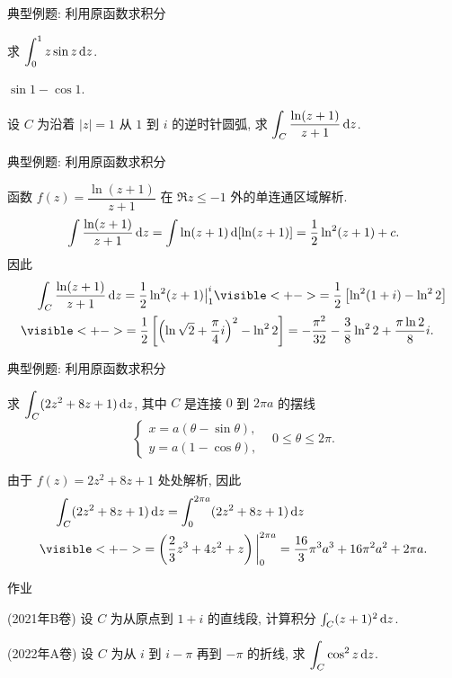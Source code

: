 \begin{frame}{典型例题: 利用原函数求积分}
\begin{exercise}
求 $\displaystyle\int_0^1 z\sin z\,\mathrm{d} z$.
\end{exercise}

\begin{answer}
$\sin 1-\cos 1$.
\end{answer}
\begin{example}
设 $C$ 为沿着 $|z|=1$ 从 $1$ 到 $i$ 的逆时针圆弧, 求 $\displaystyle\int_C\frac{\ln(z+1)}{z+1}\,\mathrm{d} z$.
\end{example}
\end{frame}


\begin{frame}{典型例题: 利用原函数求积分}
\begin{solution}
函数 $f(z)=\dfrac{\ln(z+1)}{z+1}$ 在 $\Re z\le -1$ 外的单连通区域解析.
\onslide<+->
\[\int\frac{\ln(z+1)}{z+1}\,\mathrm{d} z
=\int\ln(z+1)\,\mathrm{d}[\ln(z+1)]=\frac12\ln^2(z+1)+c.\]
\onslide<+->
因此
\begin{align*}
&\peq\int_C\frac{\ln(z+1)}{z+1}\diff z=\frac12\ln^2(z+1)\big|_1^i
\visible<+->{=\frac12\left[\ln^2(1+i)-\ln^22\right]}\\
&\visible<+->{=\frac12\left[\left(\ln\sqrt2+\frac\pi4i\right)^2-\ln^22\right]
=-\frac{\pi^2}{32}-\frac38\ln^22+\frac{\pi\ln2}{8}i.}
\end{align*}
\end{solution}
\end{frame}


\begin{frame}{典型例题: 利用原函数求积分}
\begin{example}
求 $\displaystyle\int_C(2z^2+8z+1)\,\mathrm{d} z$, 其中 $C$ 是连接 $0$ 到 $2\pi a$ 的摆线
\vspace{-8pt}
\[\begin{cases}
x=a(\theta-\sin\theta),& \\ y=a(1-\cos\theta),
\end{cases} 0\le \theta\le 2\pi.\]
\vspace{-8pt}
\end{example}
\begin{solution}
由于 $f(z)=2z^2+8z+1$ 处处解析,
\onslide<+->
因此
\begin{align*}
&\peq\int_C(2z^2+8z+1)\diff z=\int_0^{2\pi a}(2z^2+8z+1)\diff z\\
&\visible<+->{=\left(\frac23z^3+4z^2+z\right)\bigg|_0^{2\pi a}=\frac{16}3\pi^3a^3+16\pi^2a^2+2\pi a.}
\end{align*}
\vspace{-8pt}
\end{solution}
\end{frame}


{
\homework
\begin{frame}[<*>]{作业}
  \begin{homeworks}
		\item(2021年B卷) 设 $C$ 为从原点到 $1+i$ 的直线段, 计算积分 $\int_C(z+1)^2\,\mathrm{d} z$.
    \item(2022年A卷) 设 $C$ 为从 $i$ 到 $i-\pi$ 再到 $-\pi$ 的折线, 求 $\displaystyle\int_C\cos^2z\,\mathrm{d} z$.
  \end{homeworks}
\end{frame}
}




